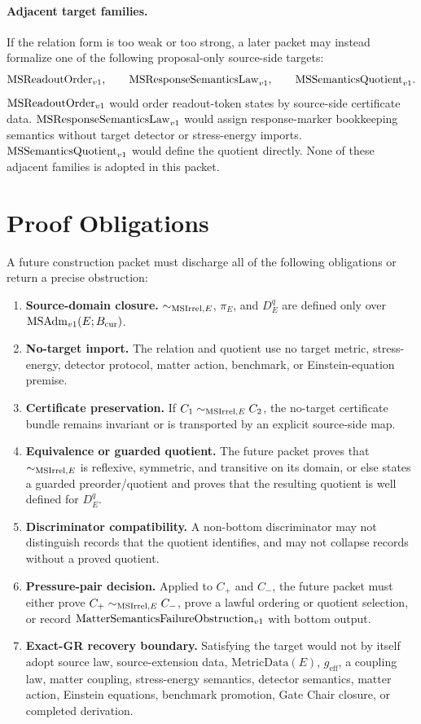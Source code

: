 \paragraph{Adjacent target families.}
If the relation form is too weak or too strong, a later packet may instead
formalize one of the following proposal-only source-side targets:
\[
  \mathrm{MSReadoutOrder}_{v1},\qquad \mathrm{MSResponseSemanticsLaw}_{v1},\qquad \mathrm{MSSemanticsQuotient}_{v1}.
\]
\(\mathrm{MSReadoutOrder}_{v1}\) would order readout-token states by source-side
certificate data.  \(\mathrm{MSResponseSemanticsLaw}_{v1}\) would assign response-marker
bookkeeping semantics without target detector or stress-energy imports.
\(\mathrm{MSSemanticsQuotient}_{v1}\) would define the quotient directly.  None of these adjacent
families is adopted in this packet.

\section{Proof Obligations}

A future construction packet must discharge all of the following obligations
or return a precise obstruction:
\begin{enumerate}
  \item \textbf{Source-domain closure.} \(\sim_{\mathrm{MSIrrel},E}\), \(\pi_E\), and
    \(D^q_E\) are defined only over \(\mathrm{MSAdm}_{v1}(E;B_{\mathrm{cur}})\).
  \item \textbf{No-target import.} The relation and quotient use no target
    metric, stress-energy, detector protocol, matter action, benchmark, or
    Einstein-equation premise.
  \item \textbf{Certificate preservation.} If \(C_1\sim_{\mathrm{MSIrrel},E} C_2\), the
    no-target certificate bundle remains invariant or is transported by an
    explicit source-side map.
  \item \textbf{Equivalence or guarded quotient.} The future packet proves
    that \(\sim_{\mathrm{MSIrrel},E}\) is reflexive, symmetric, and transitive on its domain,
    or else states a guarded preorder/quotient and proves that the resulting
    quotient is well defined for \(D^q_E\).
  \item \textbf{Discriminator compatibility.} A non-bottom discriminator may
    not distinguish records that the quotient identifies, and may not collapse
    records without a proved quotient.
  \item \textbf{Pressure-pair decision.} Applied to \(C_+\) and \(C_-\), the
    future packet must either prove \(C_+\sim_{\mathrm{MSIrrel},E} C_-\), prove a lawful
    ordering or quotient selection, or record \(\mathrm{MatterSemanticsFailureObstruction}_{v1}\) with bottom output.
  \item \textbf{Exact-GR recovery boundary.} Satisfying the target would not
    by itself adopt source law, source-extension data, \(\mathrm{MetricData}(E)\),
    \(g_{\mathrm{eff}}\), a coupling law, matter coupling, stress-energy
    semantics, detector semantics, matter action, Einstein equations,
    benchmark promotion, Gate Chair closure, or completed derivation.
\end{enumerate}

